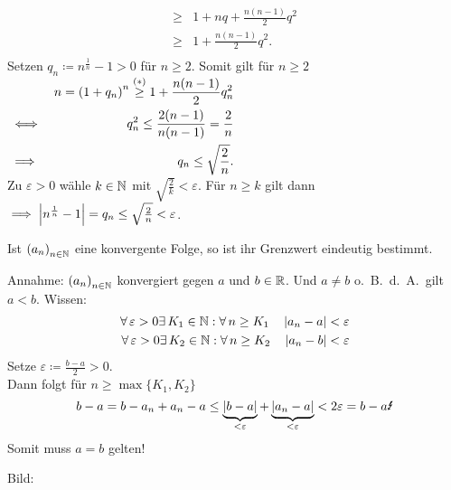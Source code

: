 \documentclass[../ana1.tex]{subfiles}
\begin{document}
\begin{bspe}
\begin{enumerate}[(1)]
\begin{bew}
\begin{align*}
						   \geq& 1 + nq + \frac{n(n-1)}{2} q^2 \\
						   \geq& 1 + \frac{n(n-1)}{2} q^2. \tag{\textasteriskcentered} \\
				\end{align*}
				Setzen \(q_n \coloneqq n^{\frac{1}{n}} - 1 > 0 \) für \(n \geq 2 \). Somit gilt für \(n \geq 2 \)\\
				\(\!\begin{aligned}[t]
					&        &n = {(1+q_n)}^n \overset{\text{(\textasteriskcentered)}}{\geq}1+\frac{n(n-1)}{2} q_n^2 \\
					&\iff    &q_n^2 \leq \frac{2(n-1)}{n(n-1)} = \frac{2}{n} \\
					&\implies& q_n \leq \sqrt{\frac{2}{n}}.
				\end{aligned}\) \\
				Zu \(\varepsilon > 0 \) wähle \(k \in \mathbb{N} \) mit \(\sqrt{\frac{2}{k}} < \varepsilon \). Für \(n \geq k \) gilt dann \\
				\(\implies \left|n^{\frac{1}{n}} - 1\right| = q_n \leq \sqrt{\frac{2}{n}} < \varepsilon \).
			  \end{bew}
	\end{enumerate}
\end{bspe}

\begin{satz}
	Ist \({(a_n)}_{n \in \mathbb{N}} \) eine konvergente Folge, so ist ihr Grenzwert eindeutig bestimmt.
\end{satz}
\begin{bew}
	Annahme: \({(a_n)}_{n\in\mathbb{N}} \) konvergiert gegen \(a \) und \(b\in\mathbb{R} \). Und \(a\neq b \) o.\ B.\ d.\ A.\ gilt \(a<b \).
	Wissen:
	\begin{align*}
		\forall \varepsilon>0\exists K_1\in\N: \forall n\geq K_1 \quad \abs{a_n -a} <\varepsilon \\
		\forall \varepsilon>0\exists K_2\in\N: \forall n\geq K_2 \quad \abs{a_n -b} <\varepsilon
	\end{align*}
	Setze \(\varepsilon\coloneqq\frac{b-a}{2} >0 \).\\
	Dann folgt für \(n\geq \max \{K_1,K_2\} \)
	\[b-a = b-a_n + a_n -a \leq \underbrace{\abs{b-a}}_{<\varepsilon} + \underbrace{\abs{a_n-a}}_{<\varepsilon} < 2\varepsilon = b-a \text{\Lightning} \]
	Somit muss \(a=b \) gelten!
\end{bew}

Bild:\\
\begin{center}
\end{center}
\end{document}
